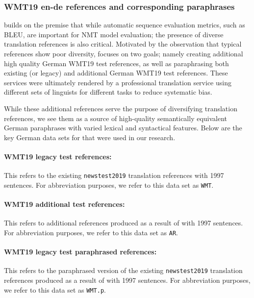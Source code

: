 \documentclass[11pt,a4paper]{article}
\begin{document}
\subsubsection{WMT19 en-de references and corresponding paraphrases}

\citet{freitag-bleu-paraphrase-references-2020} builds on the premise that while automatic sequence evaluation metrics, such as BLEU, are important for NMT model evaluation; the presence of diverse translation references is also critical. Motivated by the observation that typical references show poor diversity, \citet{freitag-bleu-paraphrase-references-2020} focuses on two goals; namely creating additional high quality German WMT19 test references, as well as paraphrasing both existing (or legacy) and additional German WMT19 test references. These services were ultimately rendered by a professional translation service using different sets of linguists for different tasks to reduce systematic bias.

While these additional references serve the purpose of diversifying translation references, we see them as a source of high-quality semantically equivalent German paraphrases with varied lexical and syntactical features. Below are the key German data sets for that were used in our research.

\paragraph{WMT19 legacy test references:} This refers to the existing \texttt{newstest2019} translation references with 1997 sentences. For abbreviation purposes, we refer to this data set as \texttt{WMT}. 

\paragraph{WMT19 additional test references:} This refers to additional references produced as a result of \citet{freitag-bleu-paraphrase-references-2020} with 1997 sentences. For abbreviation purposes, we refer to this data set as \texttt{AR}. 

\paragraph{WMT19 legacy test paraphrased references:} This refers to the paraphrased version of the existing \texttt{newstest2019} translation references produced as a result of \citet{freitag-bleu-paraphrase-references-2020} with 1997 sentences. For abbreviation purposes, we refer to this data set as \texttt{WMT.p}. 
\end{document}
